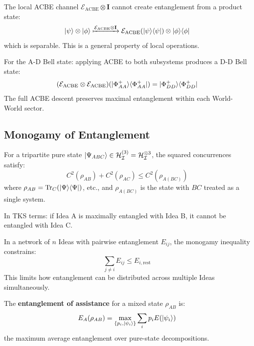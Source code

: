 \begin{corollary}
\label{cor:acbe-no-create}
The local ACBE channel $\mathcal{E}_{\mathrm{ACBE}} \otimes \mathbf{I}$ cannot create entanglement from a product state:
\[
|\psi\rangle \otimes |\phi\rangle \xmapsto{\mathcal{E}_{\mathrm{ACBE}} \otimes \mathbf{I}} \mathcal{E}_{\mathrm{ACBE}}(|\psi\rangle\langle \psi|) \otimes |\phi\rangle\langle \phi|
\]
which is separable. This is a general property of local operations.
\end{corollary}

\begin{corollary}
\label{cor:entanglement-acbe-commute}
For the A-D Bell state: applying ACBE to both subsystems produces a D-D Bell state:
\[
(\mathcal{E}_{\mathrm{ACBE}} \otimes \mathcal{E}_{\mathrm{ACBE}})(|\Phi^+_{AA}\rangle\langle \Phi^+_{AA}|) = |\Phi^+_{DD}\rangle\langle \Phi^+_{DD}|
\]
The full ACBE descent preserves maximal entanglement within each World-World sector.
\end{corollary}

\subsection{Monogamy of Entanglement}

\begin{theorem}
\label{thm:monogamy}
For a tripartite pure state $|\Psi_{ABC}\rangle \in \mathcal{H}_{\mathcal{I}}^{(3)} = \mathcal{H}_{\mathcal{I}}^{\otimes 3}$, the squared concurrences satisfy:
\[
C^2(\rho_{AB}) + C^2(\rho_{AC}) \leq C^2(\rho_{A(BC)})
\]
where $\rho_{AB} = \mathrm{Tr}_C(|\Psi\rangle\langle \Psi|)$, etc., and $\rho_{A(BC)}$ is the state with $BC$ treated as a single system.

In TKS terms: if Idea A is maximally entangled with Idea B, it cannot be entangled with Idea C.
\end{theorem}

\begin{corollary}
\label{cor:monogamy-networks}
In a network of $n$ Ideas with pairwise entanglement $E_{ij}$, the monogamy inequality constrains:
\[
\sum_{j \neq i} E_{ij} \leq E_{i,\mathrm{rest}}
\]
This limits how entanglement can be distributed across multiple Ideas simultaneously.
\end{corollary}

\begin{definition}
\label{def:eoa}
The \textbf{entanglement of assistance} for a mixed state $\rho_{AB}$ is:
\[
E_A(\rho_{AB}) = \max_{\{p_i, |\psi_i\rangle\}} \sum_i p_i E(|\psi_i\rangle)
\]
the maximum average entanglement over pure-state decompositions.
\end{definition}

